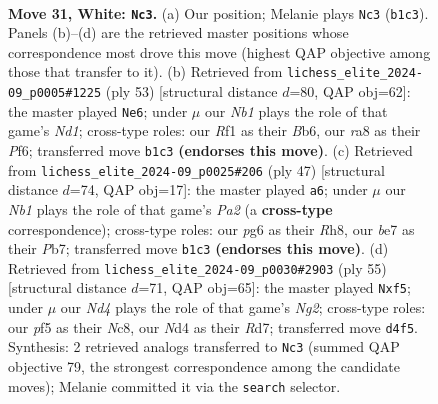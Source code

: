 \documentclass[11pt]{article}
\begin{document}
\clearpage

\begin{figure}[p]\centering
\begin{subfigure}{0.46\textwidth}\centering
\resizebox{\linewidth}{!}{%
\newchessgame
\chessboard[
  setfen={rn4r1/1p1kbb1p/6pP/p2pPp2/P2N4/6P1/1B5K/RN3R2 w - - 5 31},
  showmover=false,
  pgfstyle=straightmove, color=movearrow, markmove={b1-c3}
]}
\caption{}
\end{subfigure}\hfill
\begin{subfigure}{0.46\textwidth}\centering
\resizebox{\linewidth}{!}{%
\newchessgame
\chessboard[
  setfen={2rn2k1/5p2/pb3p1p/4p3/1pP1P3/1P6/2B1NPPP/4R1K1 b - - 0 27},
  showmover=false,
  pgfstyle=straightmove, color=movearrow, markmove={d8-e6}
]}
\caption{}
\end{subfigure}
\\[4pt]
\begin{subfigure}{0.46\textwidth}\centering
\resizebox{\linewidth}{!}{%
\newchessgame
\chessboard[
  setfen={7r/pp1b1k2/4pp2/n2p4/3P2rn/1P1BB3/P1N2P2/R4K1R b - - 1 24},
  showmover=false,
  pgfstyle=straightmove, color=movearrow, markmove={a7-a6}
]}
\caption{}
\end{subfigure}\hfill
\begin{subfigure}{0.46\textwidth}\centering
\resizebox{\linewidth}{!}{%
\newchessgame
\chessboard[
  setfen={2n2rk1/1p1r2n1/p6p/3PpPp1/6B1/6PP/PP3B2/1KR4R b - - 0 28},
  showmover=false,
  pgfstyle=straightmove, color=movearrow, markmove={g7-f5}
]}
\caption{}
\end{subfigure}
\caption{\textbf{Move 31, White: \texttt{Nc3}.} (a) Our position; Melanie plays \texttt{Nc3} (\texttt{b1c3}). Panels (b)--(d) are the retrieved master positions whose correspondence most drove this move (highest QAP objective among those that transfer to it). (b) Retrieved from \texttt{lichess\_elite\_2024-09\_p0005\#1225} (ply 53) [structural distance $d$=80, QAP obj=62]: the master played \texttt{Ne6}; under $\mu$ our \emph{Nb1} plays the role of that game's \emph{Nd1}; cross-type roles: our \emph{R}f1 as their \emph{B}b6, our \emph{r}a8 as their \emph{P}f6; transferred move \texttt{b1c3} \textbf{(endorses this move)}. (c) Retrieved from \texttt{lichess\_elite\_2024-09\_p0025\#206} (ply 47) [structural distance $d$=74, QAP obj=17]: the master played \texttt{a6}; under $\mu$ our \emph{Nb1} plays the role of that game's \emph{Pa2} (a \textbf{cross-type} correspondence); cross-type roles: our \emph{p}g6 as their \emph{R}h8, our \emph{b}e7 as their \emph{P}b7; transferred move \texttt{b1c3} \textbf{(endorses this move)}. (d) Retrieved from \texttt{lichess\_elite\_2024-09\_p0030\#2903} (ply 55) [structural distance $d$=71, QAP obj=65]: the master played \texttt{Nxf5}; under $\mu$ our \emph{Nd4} plays the role of that game's \emph{Ng2}; cross-type roles: our \emph{p}f5 as their \emph{N}c8, our \emph{N}d4 as their \emph{R}d7; transferred move \texttt{d4f5}. Synthesis: 2 retrieved analogs transferred to \texttt{Nc3} (summed QAP objective 79, the strongest correspondence among the candidate moves); Melanie committed it via the \texttt{search} selector.}
\label{fig:thought-m60}
\end{figure}
\end{document}
